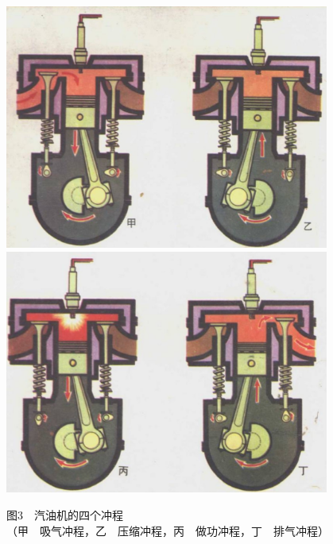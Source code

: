 \begin{figure}[H]
    \centering
    \includegraphics[width=0.95\textwidth]{../pic/czwl2-pic3-a}
    \includegraphics[width=0.95\textwidth]{../pic/czwl2-pic3-b}
    \caption*{图3　汽油机的四个冲程\\（甲　吸气冲程，乙　压缩冲程，丙　做功冲程，丁　排气冲程）}\label{fig:pic3}
\end{figure}
